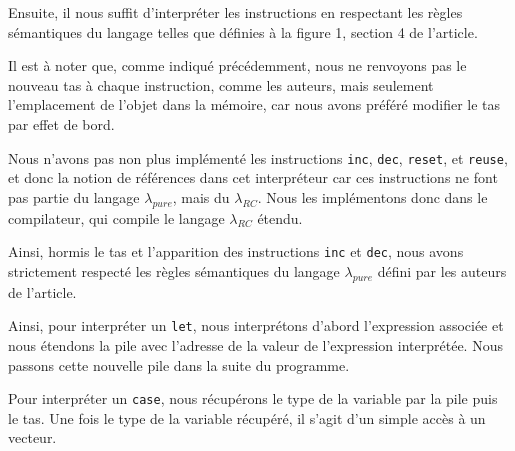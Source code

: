 \documentclass{rapportECL}
\begin{document}
Ensuite, il nous suffit d'interpréter les instructions en respectant les règles sémantiques du langage telles que définies à la figure 1, section 4 de l'article\cite{ullrich_counting_2020}.



\medskip


Il est à noter que, comme indiqué précédemment, nous ne renvoyons pas le nouveau tas à chaque instruction, comme les auteurs, 
mais seulement l'emplacement de l'objet dans la mémoire, car nous avons préféré modifier le tas par effet de bord.

Nous n'avons pas non plus implémenté les instructions \verb|inc|, \verb|dec|, \verb|reset|, et \verb|reuse|, et donc la notion de références dans cet interpréteur car ces instructions ne font pas partie du langage $\lambda_{pure}$, mais du $\lambda_{RC}$.
Nous les implémentons donc dans le compilateur, qui compile le langage $\lambda_{RC}$ étendu.

Ainsi, hormis le tas et l'apparition des instructions \verb|inc| et \verb|dec|, nous avons strictement respecté les règles sémantiques du langage $\lambda_{pure}$ défini par les auteurs de l'article.

\medskip

Ainsi, pour interpréter un \verb|let|, nous interprétons d'abord l'expression associée et nous étendons la pile avec l'adresse de la valeur de l'expression interprétée. Nous passons cette nouvelle pile dans la suite du programme.


Pour interpréter un \verb|case|, nous récupérons le type de la variable par la pile puis le tas.
Une fois le type de la variable récupéré, il s'agit d'un simple accès à un vecteur.
\end{document}
